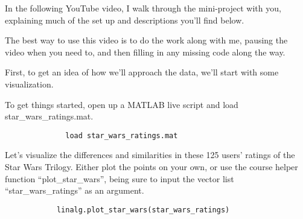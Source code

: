\documentclass{ximera}
\begin{document}
\begin{exploration}
  \vspace{1em}

  \begin{remark}
  
    In the following YouTube video, I walk through the mini-project with you, explaining much of the set up and descriptions you'll find below. 
    
    The best way to use this video is to do the work along with me, pausing the video when you need to, and then filling in any missing code along the way.

    \begin{center}
    \end{center}

  \end{remark}

  First, to get an idea of how we'll approach the data, we'll start with some visualization.

  To get things started, open up a MATLAB live script and load star\_wars\_ratings.mat.

  \begin{remark}
          \begin{verbatim}
              load star_wars_ratings.mat
          \end{verbatim}
  \end{remark}

  Let's visualize the differences and similarities in these 125 users' ratings of the Star Wars Trilogy. Either plot the points on your own, or use the course helper function ``plot\_star\_wars'', being sure to input the vector list ``star\_wars\_ratings'' as an argument.

  \begin{remark}
        \begin{verbatim}
            linalg.plot_star_wars(star_wars_ratings)
        \end{verbatim}
  \end{remark}


\end{exploration}
\end{document}
